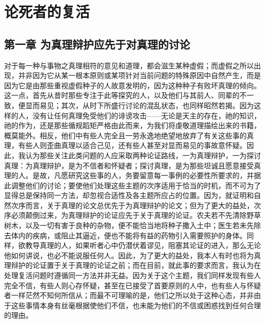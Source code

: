 
\chapter{论死者的复活}



\section{第一章 为真理辩护应先于对真理的讨论}

对于每一种与事物之真理相符的意见和道理，都会滋生某种虚假；而虚假之所以出现，并非因为它从某一根本原则或某项针对当前问题的特殊原因中自然产生，而是因为它是由那些重视虚假种子的人故意发明的，因为这种种子有败坏真理的倾向。这一点，首先从昔时那些专注于此等探究的人，以及他们与其前人、同辈的不一致，便显而易见；其次，从时下所盛行讨论的混乱状态，也同样昭然若揭。因为这样的人，没有让任何真理免受他们的诽谤攻击——无论是天主的存在，祂的知识，祂的作为，还是那些循规蹈矩严格由此而来，为我们将虔敬道理描绘出来的书籍，概莫能外。相反，他们中有些人完全且一劳永逸地绝望地放弃了有关这些事的真理，有些人则歪曲真理以适合己见，还有些人甚至对显而易见的事故意怀疑。因此，我认为那些关注此类问题的人应采取两种论证路线，一为真理辩护，一为探讨真理：为真理辩护，是为不信者和怀疑者；探讨真理，是为那些坦诚且愿意接受真理的人。是故，凡愿研究这些事的人，务要留意每一事例的必要性所要求的，并据此调整他们的讨论；要使他们处理这些主题的次序适用于恰当的时机，而不可为了显得总是保持同一方法，却忽视合适性及各主题所应占的位置。因为，就证明和自然次序而言，关于真理的论文总优先于为真理辩护的论文；但为了更大的益处，次序必须颠倒过来，为真理辩护的论证应先于关于真理的论证。农夫若不先清除野草树木，以及一切有害于良种的杂物，便不能恰当地将种子撒入土中；医生若未先除去体内的疾病，或阻止其逼近，便也不能将有益的药物引入需要照护的身体。同样，欲教导真理的人，如果听者心中仍潜伏着谬见，阻塞其论证的进入，那么无论他如何讲说，也必不能说服任何人。因此，为了更大的益处，我本人有时也将为真理辩护的论证置于关于真理的论证之前；而在目前，就此事的要求而言，我认为在处理复活问题时遵循同一方法并非无益。因为关于这个主题，我们同样发现有些人完全不信，有些人则心存怀疑，甚至在已接受了首要原则的人中，也有些人与怀疑者一样茫然不知何所信从；而最不可理喻的是，他们之所以处于这种心态，并非由于这些事情本身有丝毫根据使他们不信，也未能为他们的不信或困惑找到任何合理的理由。\par

